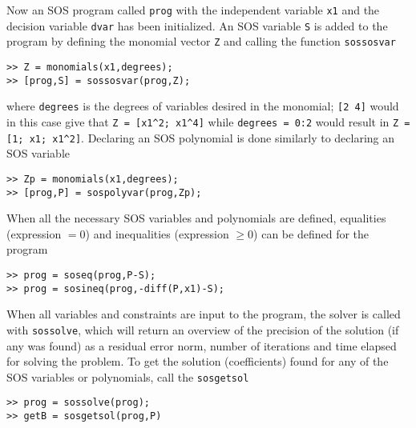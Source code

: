 Now an SOS program called \texttt{prog} with the independent variable \texttt{x1} and the decision variable \texttt{dvar} has been initialized. An SOS variable \texttt{S} is added to the program by defining the monomial vector \texttt{Z} and calling the function \texttt{sossosvar}

\hspace*{1cm} \texttt{>> Z = monomials(x1,degrees);}\\
\hspace*{1cm} \texttt{>> [prog,S] = sossosvar(prog,Z);}

where \texttt{degrees} is the degrees of variables desired in the monomial; \texttt{[2 4]} would in this case give that \verb|Z = [x1^2; x1^4]| while \texttt{degrees = 0:2} would result in \verb|Z = [1; x1; x1^2]|. Declaring an SOS polynomial is done similarly to declaring an SOS variable

\hspace*{1cm} \texttt{>> Zp = monomials(x1,degrees);}\\
\hspace*{1cm} \texttt{>> [prog,P] = sospolyvar(prog,Zp);}

When all the necessary SOS variables and polynomials are defined, equalities (expression $=0$) and inequalities (expression $\geq 0$) can be defined for the program

\hspace*{1cm} \texttt{>> prog = soseq(prog,P-S);}\\
\hspace*{1cm} \texttt{>> prog = sosineq(prog,-diff(P,x1)-S);}

When all variables and constraints are input to the program, the solver is called with \texttt{sossolve}, which will return an overview of the precision of the solution (if any was found) as a residual error norm, number of iterations and time elapsed for solving the problem. To get the solution (coefficients) found for any of the SOS variables or polynomials, call the \texttt{sosgetsol}

\hspace*{1cm} \texttt{>> prog = sossolve(prog);}\\
\hspace*{1cm} \texttt{>> getB = sosgetsol(prog,P)}


